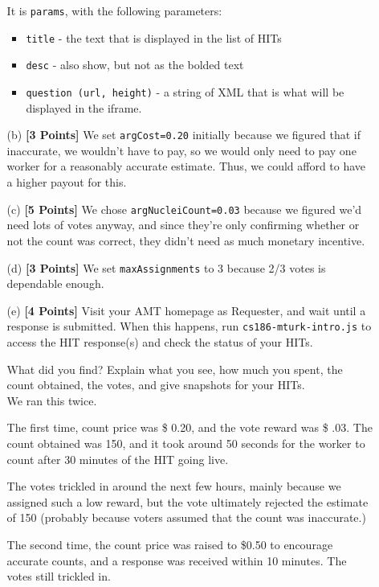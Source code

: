 \documentclass[11pt]{article}
\newcommand{\points}[1]{\textbf{[#1 Points]}}
\begin{document}
\begin{enumerate}
\begin{enumerate}
It is \texttt{params}, with the following parameters:
\begin{itemize}
\item \texttt{title} - the text that is displayed in the list of HITs
\item \texttt{desc} - also show, but not as the bolded text
\item \texttt{question (url, height)} - a string of XML that is what will be displayed in the iframe.
\end{itemize}
%
\item[(b)] \points{3}
We set \texttt{argCost=0.20} initially because we figured that if inaccurate, we wouldn't have to pay, so we would only need to pay one worker for a reasonably accurate estimate. Thus, we could afford to have a higher payout for this.

%
\item[(c)] \points{5} We chose
\texttt{argNucleiCount=0.03} because we figured we'd need lots of votes anyway, and since they're only confirming whether or not the count was correct, they didn't need as much monetary incentive. 

\item[(d)] \points{3} We set 
\texttt{maxAssignments} to 3 because 2/3 votes is dependable enough.

\item[(e)] \points{4} Visit your AMT homepage as Requester, 
and wait until a response is submitted. When this happens, 
run \texttt{cs186-mturk-intro.js} to access the HIT response(s)
and check the status of your HITs.

What did you find?
Explain what you see, how much you spent, the count
obtained, the votes, and
give snapshots for your HITs.\medskip 
%
\\We ran this twice. 

The first time, count price was \$ 0.20, and the vote reward was \$ .03. The count obtained was 150, and it took around 50 seconds for the worker to count after 30 minutes of the HIT going live. 

The votes trickled in around the next few hours, mainly because we assigned such a low reward, but the vote ultimately rejected the estimate of 150 (probably because voters assumed that the count was inaccurate.)

The second time, the count price was raised to \$0.50 to encourage accurate counts, and a response was received within 10 minutes. The votes still trickled in.





\end{enumerate}
\end{enumerate}
\end{document}
